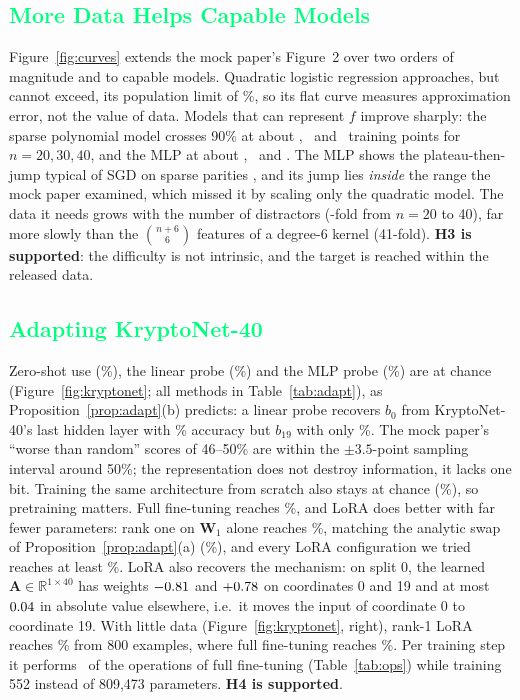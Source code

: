 \documentclass{article}
\newcommand{\csubsection}[1]{\subsection{\textcolor{springgreen}{#1}}}
\theoremstyle{plain}
\newcommand{\R}{\mathbb{R}}
\newcommand{\W}{\mathbf{W}}
\newcommand{\A}{\mathbf{A}}
\begin{document}
\csubsection{More Data Helps Capable Models}
\label{sec:curves}
Figure~\ref{fig:curves} extends the mock paper's Figure~2 over two orders of magnitude and to capable models. Quadratic logistic regression approaches, but cannot exceed, its population limit of \LimitTwo\%, so its flat curve measures approximation error, not the value of data. Models that can represent $f$ improve sharply: the sparse polynomial model crosses 90\% at about \NsparseTwenty, \NsparseThirty\ and \NsparseForty\ training points for $n=20,30,40$, and the MLP at about \NmlpTwenty, \NmlpThirty\ and \NmlpForty. The MLP shows the plateau-then-jump typical of SGD on sparse parities \citep{barak2022hidden}, and its jump lies \emph{inside} the range the mock paper examined, which missed it by scaling only the quadratic model. The data it needs grows with the number of distractors (\MLPgrowth-fold from $n=20$ to 40), far more slowly than the $\binom{n+6}{6}$ features of a degree-6 kernel (41-fold). \textbf{H3 is supported}: the difficulty is not intrinsic, and the target is reached within the released data.


\csubsection{Adapting KryptoNet-40}
\label{sec:kryptonet}
Zero-shot use (\ZeroShotMean\%), the linear probe (\LPMean\%) and the MLP probe (\MLPProbeMean\%) are at chance (Figure~\ref{fig:kryptonet}; all methods in Table~\ref{tab:adapt}), as Proposition~\ref{prop:adapt}(b) predicts: a linear probe recovers $b_0$ from KryptoNet-40's last hidden layer with \ProbeBitZero\% accuracy but $b_{19}$ with only \ProbeBitNineteen\%. The mock paper's ``worse than random'' scores of 46--50\% are within the $\pm3.5$-point sampling interval around 50\%; the representation does not destroy information, it lacks one bit. Training the same architecture from scratch also stays at chance (\ScratchMean\%), so pretraining matters. Full fine-tuning reaches \FullFTMean\%, and LoRA does better with far fewer parameters: rank one on $\W_1$ alone reaches \LoRAoneMean\%, matching the analytic swap of Proposition~\ref{prop:adapt}(a) (\SwapMean\%), and every LoRA configuration we tried reaches at least \LoRAminMean\%. LoRA also recovers the mechanism: on split 0, the learned $\A\in\R^{1\times40}$ has weights $-0.81$ and $+0.78$ on coordinates 0 and 19 and at most $0.04$ in absolute value elsewhere, i.e.\ it moves the input of coordinate 0 to coordinate 19. With little data (Figure~\ref{fig:kryptonet}, right), rank-1 LoRA reaches \LoRAatEightHundred\% from 800 examples, where full fine-tuning reaches \FullFTatEightHundred\%. Per training step it performs \NetRatio\ of the operations of full fine-tuning (Table~\ref{tab:ops}) while training 552 instead of 809,473 parameters. \textbf{H4 is supported}.
\end{document}
